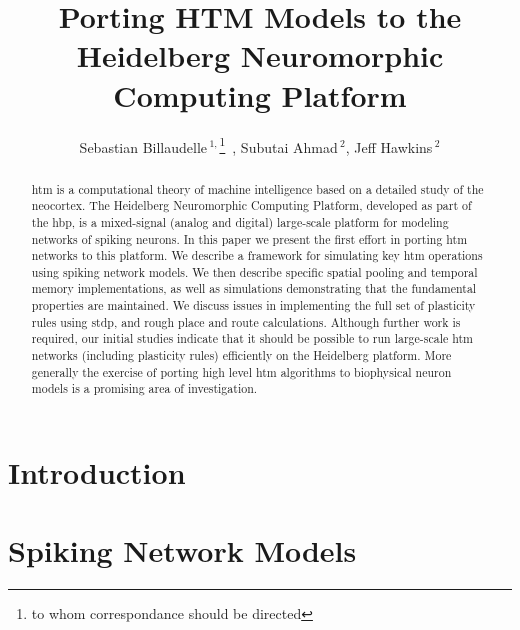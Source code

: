 \documentclass{reporter}
\begin{document}

\title[Porting HTM Models to a Neuromorphic Platform]{Porting HTM Models to the Heidelberg Neuromorphic Computing Platform}
\author[Billaudelle]{Sebastian Billaudelle\,$^{1,}$\footnote{to whom correspondance should be directed}\ , Subutai Ahmad\,$^{2}$, Jeff Hawkins\,$^{2}$}
\address{$^{1}$Kirchhoff-Institute for Physics, Heidelberg, Germany\\
$^{2}$Numenta, Inc., Redwood City, CA}



\maketitle

\begin{abstract}

\gls{htm} is a computational theory of machine
intelligence based on a detailed study of the neocortex. The Heidelberg
Neuromorphic Computing Platform, developed as part of the \gls{hbp},
is a mixed-signal (analog and digital) large-scale platform for
modeling networks of spiking neurons. In this paper we present the first effort
in porting \gls{htm} networks to this platform.  We describe a framework for
simulating key \gls{htm} operations  using spiking network models. We then describe
specific spatial pooling and temporal memory implementations, as well as
simulations demonstrating that the fundamental properties are maintained. We
discuss issues in implementing the full set of plasticity rules using \gls{stdp}, and
rough place and route calculations. Although further work is required, our
initial studies indicate that it should be  possible to run large-scale \gls{htm}
networks (including plasticity rules) efficiently on the Heidelberg platform.
More generally the exercise of porting high level \gls{htm} algorithms to biophysical
neuron models is a promising area of investigation.

\end{abstract}

\glsresetall

\section{Introduction}


\section{Spiking Network Models}

\end{document}
